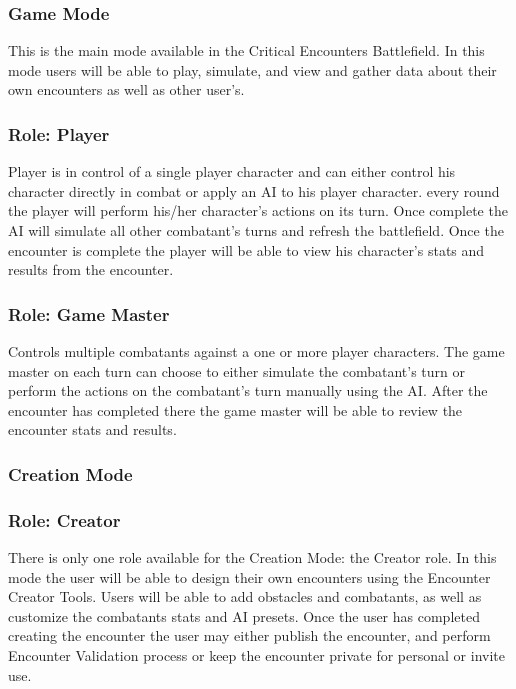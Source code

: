\documentclass[12pt,a4paper]{report}
\begin{document}
		\subsubsection{Game Mode}
			This is the main mode available in the Critical Encounters Battlefield. In this mode users will be able to play, simulate, and view and gather data about their own encounters as well as other user's.
			\subsubsection{Role: Player}
				Player is in control of a single player character and can either control his character directly in combat or apply an AI to his player character. every round the player will perform his/her character's actions on its turn. Once complete the AI will simulate all other combatant's turns and refresh the battlefield. Once the encounter is complete the player will be able to view his character's stats and results from the encounter.
			\subsubsection{Role: Game Master}
				Controls multiple combatants against a one or more player characters. The game master on each turn can choose to either simulate the combatant's turn or perform the actions on the combatant's turn manually using the AI. After the encounter has completed there the game master will be able to review the encounter stats and results.
				
		\subsubsection{Creation Mode}
			\subsubsection{Role: Creator}
				There is only one role available for the Creation Mode: the Creator role. In this mode the user will be able to design their own encounters using the Encounter Creator Tools. Users will be able to add obstacles and combatants, as well as customize the combatants stats and AI presets. Once the user has completed creating the encounter the user may either publish the encounter, and perform Encounter Validation process or keep the encounter private for personal or invite use.
	\newpage
\end{document}
